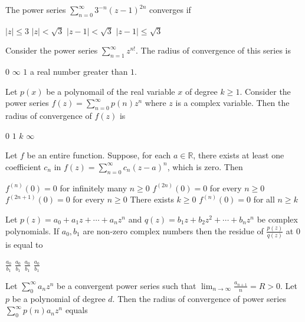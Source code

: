 \documentclass[10pt]{exam}
\newcommand{\R}{\ensuremath{\mathbb{R}}}
\begin{document}
\begin{questions}
\question 
The power series $\sum_{n = 0}^{\infty} 3^{-n} (z - 1)^{2n} $ converges if 

\begin{oneparchoices}
\choice $|z|\leq 3$ 
\choice $|z| <  \sqrt{3}$ 
\choice $|z-1| < \sqrt{3}$ 
\choice $|z-1| \leq \sqrt{3}$ 
\end{oneparchoices}

\question 
Consider the power series $\sum_{n =1}^{\infty} z^{n!}$. The radius of convergence of this series is 

\begin{oneparchoices}
\choice $0$ 
\choice $\infty$ 
\choice $1$ 
\choice a real number greater than $1$. 
\end{oneparchoices}

\question 
Let $p(x)$ be a polynomail of the real variable $x$ of degree $k \geq 1$. Consider the power series $f(z) = \sum_{n = 0}^{\infty} p(n) z^n$ where $z$  is a complex variable. Then the radius of convergence of $f(z)$ is 

\begin{oneparchoices}
\choice $0$ 
\choice $1$ 
\choice $k$ 
\choice $\infty $ 
\end{oneparchoices}

\question 
Let $f$ be an entire function. Suppose, for each $a \in \R$, there exists at least one coefficient $c_n$ in $f(z) = \sum_{n = 0}^{\infty} c_n (z - a)^n$, which is zero. Then 

\begin{choices} 
\choice $f^{(n)}(0) = 0$ for infinitely many $n \geq 0$ 
\choice $f^{(2n)}(0) = 0$ for every $n \geq 0$ 
\choice $f^{(2n + 1)}(0) = 0$ for every $n \geq 0$ 
\choice There exists $k \geq 0$ $f^{(n)}(0) = 0$ for all $n \geq k$ 
\end{choices}

\question 
Let $p(z) = a_0 + a_1z + \cdots + a_nz^n$ and $q(z) = b_1z + b_2z^2 + \cdots + b_nz^n$ be complex polynomials. If $a_0, b_1$ are non-zero complex numbers then the residue of $\frac{p(z)}{q(z)}$ at $0$ is equal to 

\begin{oneparchoices} 
\choice $\frac{a_0}{b_1}$
\choice $\frac{a_0}{b_1}$
\choice $\frac{a_0}{b_1}$
\choice $\frac{a_0}{b_1}$
\end{oneparchoices}

\question 
Let $\sum_0^{\infty}a_nz^n$ be a convergent power series such that $\lim_{n\rightarrow \infty} \frac{a_{n + 1}}{n} = R > 0$. Let $p$ be a polynomial of degree $d$. Then the radius of convergence of power series $\sum_0^{\infty}p(n) a_nz^n$ equals 


\end{questions}
\end{document}
